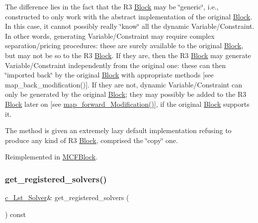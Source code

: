 The difference lies in the fact that the R3 \mbox{\hyperlink{class_s_m_spp__di__unipi__it_1_1_block}{Block}} may be \char`\"{}generic\char`\"{}, i.\+e., constructed to only work with the abstract implementation of the original \mbox{\hyperlink{class_s_m_spp__di__unipi__it_1_1_block}{Block}}. In this case, it cannot possibly really \char`\"{}know\char`\"{} all the dynamic Variable/\+Constraint. In other words, generating Variable/\+Constraint may require complex separation/pricing procedures\+: these are surely available to the original \mbox{\hyperlink{class_s_m_spp__di__unipi__it_1_1_block}{Block}}, but may not be so to the R3 \mbox{\hyperlink{class_s_m_spp__di__unipi__it_1_1_block}{Block}}. If they are, then the R3 \mbox{\hyperlink{class_s_m_spp__di__unipi__it_1_1_block}{Block}} may generate Variable/\+Constraint independently from the original one\+: these can then \char`\"{}imported back\char`\"{} by the original \mbox{\hyperlink{class_s_m_spp__di__unipi__it_1_1_block}{Block}} with appropriate methods \mbox{[}see map\+\_\+back\+\_\+modification()\mbox{]}. If they are not, dynamic Variable/\+Constraint can only be generated by the original \mbox{\hyperlink{class_s_m_spp__di__unipi__it_1_1_block}{Block}}; they may possibly be added to the R3 \mbox{\hyperlink{class_s_m_spp__di__unipi__it_1_1_block}{Block}} later on \mbox{[}see \mbox{\hyperlink{class_s_m_spp__di__unipi__it_1_1_block_a26eeed482e287e1f8a384826c789f9e0}{map\+\_\+forward\+\_\+\+Modification()}}\mbox{]}, if the original \mbox{\hyperlink{class_s_m_spp__di__unipi__it_1_1_block}{Block}} supports it.

The method is given an extremely lazy default implementation refusing to produce any kind of R3 \mbox{\hyperlink{class_s_m_spp__di__unipi__it_1_1_block}{Block}}, comprised the \char`\"{}copy\char`\"{} one. 

Reimplemented in \mbox{\hyperlink{class_s_m_spp__di__unipi__it_1_1_m_c_f_block_a36fbb6f247e14792e84f68e801c49783}{M\+C\+F\+Block}}.

\mbox{\label{class_s_m_spp__di__unipi__it_1_1_block_a052e250efe81b0840361e70c520bdd7f}} 
\subsubsection{\texorpdfstring{get\+\_\+registered\+\_\+solvers()}{get\_registered\_solvers()}}
{\footnotesize\ttfamily \mbox{\hyperlink{namespace_s_m_spp__di__unipi__it_aa4d2cd4385e5eb96e9807bbdc1490b3b}{c\+\_\+\+Lst\+\_\+\+Solver}}\& get\+\_\+registered\+\_\+solvers (\begin{DoxyParamCaption}\item[{void}]{ }\end{DoxyParamCaption}) const\hspace{0.3cm}{\ttfamily [inline]}}



